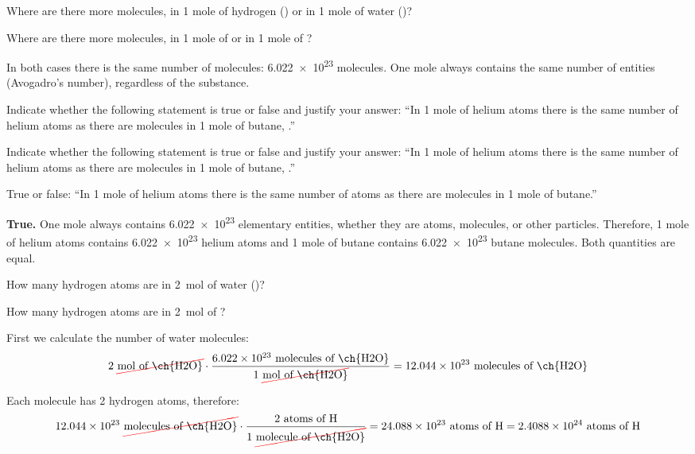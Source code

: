 \begin{exercise}
    Where are there more molecules, in 1 mole of hydrogen () or in 1 mole of water ()?
    \begin{solu}
        Where are there more molecules, in 1 mole of  or in 1 mole of ?

        In both cases there is the same number of molecules: \num{6.022e23} molecules. One mole always contains the same number of entities (Avogadro's number), regardless of the substance.
    \end{solu}
\end{exercise}

\begin{exercise}
    Indicate whether the following statement is true or false and justify your answer:
    ``In 1 mole of helium atoms there is the same number of helium atoms as there are molecules in 1 mole of butane, .''
    \begin{solu}
        Indicate whether the following statement is true or false and justify your answer:
        ``In 1 mole of helium atoms there is the same number of helium atoms as there are molecules in 1 mole of butane, .''

        True or false: ``In 1 mole of helium atoms there is the same number of atoms as there are molecules in 1 mole of butane.''

        \textbf{True.} One mole always contains \num{6.022e23} elementary entities, whether they are atoms, molecules, or other particles. Therefore, 1 mole of helium atoms contains \num{6.022e23} helium atoms and 1 mole of butane contains \num{6.022e23} butane molecules. Both quantities are equal.
    \end{solu}
\end{exercise}

\begin{exercise}
    How many hydrogen atoms are in \qty{2}{\mole} of water ()?
    \begin{solu}
        How many hydrogen atoms are in \qty{2}{\mole} of ?

        First we calculate the number of water molecules:
        \begin{equation*}
            2\ \cancelred{\unit{\mole}\ \text{of \ch{H2O}}} \cdot \dfrac{\num{6.022e23}\ \text{molecules of \ch{H2O}}}{1\ \cancelred{\unit{\mole}\ \text{of \ch{H2O}}}} = \num{12.044e23}\ \text{molecules of \ch{H2O}}
        \end{equation*}

        Each  molecule has 2 hydrogen atoms, therefore:
        \begin{equation*}
            \num{12.044e23}\ \cancelred{\text{molecules of \ch{H2O}}} \cdot \dfrac{2\ \text{atoms of H}}{1\ \cancelred{\text{molecule of \ch{H2O}}}} = \num{24.088e23}\ \text{atoms of H} = \num{2.4088e24}\ \text{atoms of H}
        \end{equation*}
    \end{solu}
\end{exercise}


